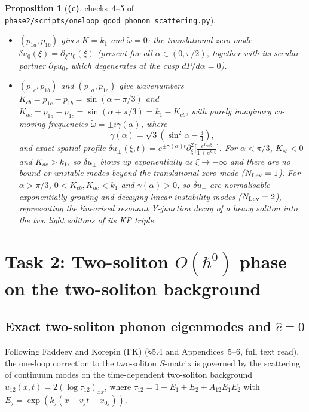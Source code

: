 \documentclass[11pt,a4paper]{article}
\newcommand{\Lc}{\textsf{\textbf{(c)}}}
\newcommand{\script}[1]{\texttt{phase2/\allowbreak scripts/\allowbreak #1}}
\newtheorem{proposition}{Proposition}[section]
\theoremstyle{remark}
\begin{document}
\begin{proposition}[\Lc, checks~4--5 of \script{oneloop\_good\_phonon\_scattering.py}]
\begin{enumerate}
\begin{itemize}
\item $(p_{1a},p_{1b})$ gives $K=k_1$ and $\tilde\omega=0$: the \emph{translational zero mode} $\delta u_0(\xi)=\partial_\xi u_0(\xi)$ (present for all $\alpha\in(0,\pi/2)$, together with its secular partner $\partial_P u_0$, which degenerates at the cusp $dP/d\alpha=0$).
\item $(p_{1c},p_{1b})$ and $(p_{1a},p_{1c})$ give wavenumbers $K_{cb}=p_{1c}-p_{1b}=\sin(\alpha-\pi/3)$ and $K_{ac}=p_{1a}-p_{1c}=\sin(\alpha+\pi/3)=k_1-K_{cb}$, with purely imaginary co-moving frequencies $\tilde\omega=\pm i\gamma(\alpha)$, where
\begin{equation}\label{eq:gamma_instability}
\gamma(\alpha)=\sqrt{3}\left(\sin^2\alpha-\tfrac34\right),
\end{equation}
and exact spatial profile $\delta u_{\pm}(\xi,t)=e^{\pm\gamma(\alpha)t}\partial_\xi^2\big[\frac{e^{K_{cb}\xi}}{1+e^{k_1\xi}}\big]$. For $\alpha<\pi/3$, $K_{cb}<0$ and $K_{ac}>k_1$, so $\delta u_\pm$ blows up exponentially as $\xi\to-\infty$ and there are \emph{no bound or unstable modes beyond the translational zero mode} ($N_{\rm Lev}=1$). For $\alpha>\pi/3$, $0<K_{cb},K_{ac}<k_1$ and $\gamma(\alpha)>0$, so $\delta u_\pm$ are \emph{normalisable exponentially growing and decaying linear instability modes} ($N_{\rm Lev}=2$), representing the linearised resonant Y-junction decay of a heavy soliton into the two light solitons of its KP triple.
\end{itemize}
\end{enumerate}
\end{proposition}

\section{Task 2: Two-soliton $O(\hbar^0)$ phase on the two-soliton background}\label{sec:task2}

\subsection{Exact two-soliton phonon eigenmodes and $\hat{c}=0$}

Following Faddeev and Korepin (FK) \cite{FK78} (\S 5.4 and Appendices~5--6, full text read), the one-loop correction to the two-soliton $S$-matrix is governed by the scattering of continuum modes on the time-dependent two-soliton background $u_{12}(x,t)=2(\log\tau_{12})_{xx}$, where $\tau_{12}=1+E_1+E_2+A_{12}E_1 E_2$ with $E_j=\exp(k_j(x-v_j t-x_{0j}))$.
\end{document}
